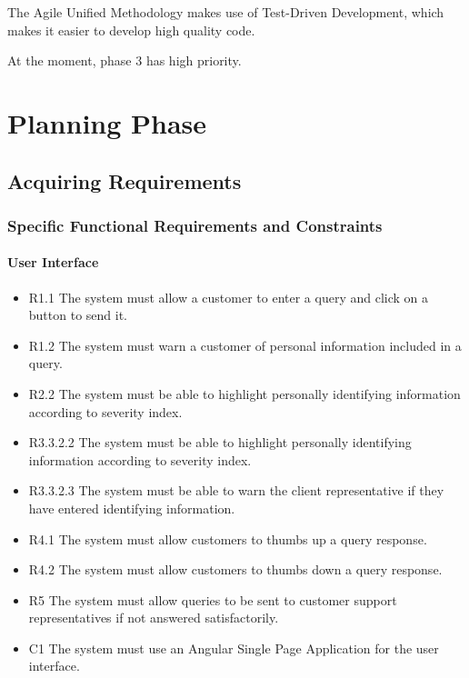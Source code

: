 \documentclass[11pt]{article}
\begin{document}
The Agile Unified Methodology makes use of Test-Driven Development, which makes it easier to develop high quality code.


At the moment, phase 3 has high priority.

\section{Planning Phase}

\subsection{Acquiring Requirements}

\subsubsection{Specific Functional Requirements and Constraints}

\paragraph{User Interface}
\begin{itemize}
  \item[] R1.1 The system must allow a customer to enter a query and click on a button to send it.
  \item[] R1.2 The system must warn a customer of personal information included in a query.
  \item[] R2.2 The system must be able to highlight personally identifying information according to severity index.
  \item[] R3.3.2.2 The system must be able to highlight personally identifying information according to severity index.
  \item[] R3.3.2.3 The system must be able to warn the client representative if they have entered identifying information.
  \item[] R4.1 The system must allow customers to thumbs up a query response.
  \item[] R4.2 The system must allow customers to thumbs down a query response.
  \item[] R5 The system must allow queries to be sent to customer support representatives if not answered satisfactorily.
  \item[] C1 The system must use an Angular Single Page Application for the user interface.
\end{itemize}
\end{document}
